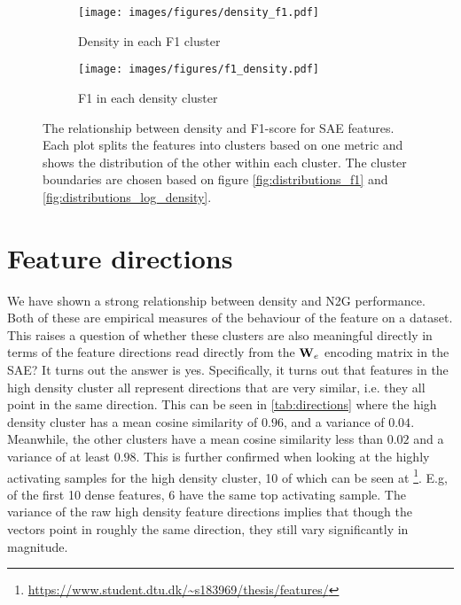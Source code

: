 \begin{figure}[ht]
    \centering
    
    \begin{subfigure}[b]{0.45\textwidth}
        \centering
        \texttt{[image: images/figures/density\_f1.pdf]}
        \caption{Density in each F1 cluster}
        \label{fig:density_f1}
    \end{subfigure}
    \begin{subfigure}[b]{0.45\textwidth}
        \centering
        \texttt{[image: images/figures/f1\_density.pdf]}
        \caption{F1 in each density cluster}
        \label{fig:f1_density}
    \end{subfigure}
    
    \caption{The relationship between density and F1-score for SAE features.
    Each plot splits the features into clusters based on one metric and shows the distribution of the other within each cluster.
    The cluster boundaries are chosen based on figure \ref{fig:distributions_f1} and \ref{fig:distributions_log_density}.}
    \label{fig:density_f1_cluster_check}
\end{figure}

\section{Feature directions}
We have shown a strong relationship between density and N2G performance.
Both of these are empirical measures of the behaviour of the feature on a dataset.
This raises a question of whether these clusters are also meaningful directly in terms of the feature directions read directly from the $\mathbf{W}_e$ encoding matrix in the SAE?
It turns out the answer is yes.
Specifically, it turns out that features in the high density cluster all represent directions that are very similar, i.e. they all point in the same direction.
This can be seen in \autoref{tab:directions} where the high density cluster has a mean cosine similarity of $0.96$, and a variance of $0.04$.
Meanwhile, the other clusters have a mean cosine similarity less than $0.02$ and a variance of at least $0.98$.
This is further confirmed when looking at the highly activating samples for the high density cluster, 10 of which can be seen at \footnote{\url{https://www.student.dtu.dk/~s183969/thesis/features/}}.
E.g, of the first 10 dense features, 6 have the same top activating sample.
The variance of the raw high density feature directions implies that though the vectors point in roughly the same direction, they still vary significantly in magnitude.

